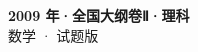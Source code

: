 \documentclass[zihao=-4, a4paper]{ctexart}
\begin{document}
\begin{center}
  {\Large\bfseries 2009 年·全国大纲卷Ⅱ·理科}\\[4pt]
  {\large 数学 · 试题版}
\end{center}
\medskip
{}

\end{document}
